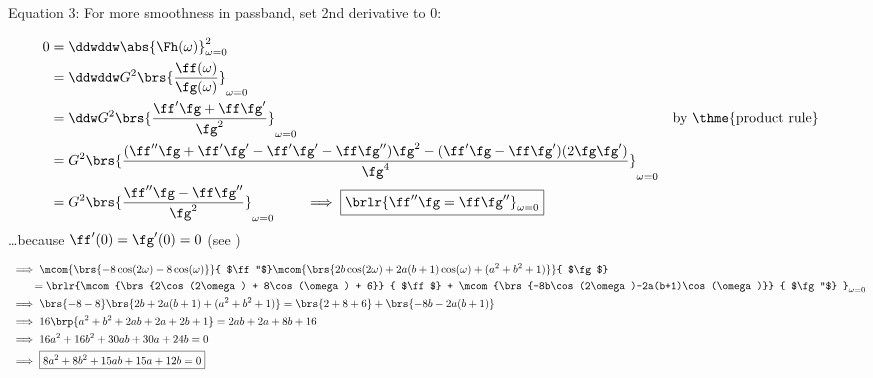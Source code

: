 Equation 3: For more smoothness in passband, set 2nd derivative to 0:
{\begin{align*}
  0 &= \ddwddw\abs{\Fh(\omega)}^2_{\omega=0}
  \\&= \ddwddw G^2 \brs{\frac{\ff(\omega)}
                             {\fg(\omega)}
                       }_{\omega=0}
  \\&= \ddw    G^2 \brs{\frac{\ff'\fg + \ff \fg'}
                             {\fg^2}
                       }_{\omega=0}
    && \text{by \thme{product rule}}
  \\&=         G^2 \brs{\frac{(\ff''\fg + \ff'\fg' - \ff'\fg' -\ff\fg'')\fg^2 - (\ff'\fg - \ff\fg')(2\fg\fg')}
                             {\fg^4}
                       }_{\omega=0}
  \\&=         G^2 \brs{\frac{\ff''\fg -\ff\fg''}
                             {\fg^2}
                       }_{\omega=0}
     \qquad \implies \boxed{\brlr{\ff''\fg = \ff\fg''}_{\omega=0}}
\end{align*}
\ldots because $\ff'(0) = \fg'(0) = 0$ (see )
 
{ \begin{align*}
  &\implies \mcom{\brs{-8\cos(2\omega)-8\cos(\omega)}}
                   { $\ff''$}
                    \mcom{\brs{2b\cos(2\omega)+2a(b+1)\cos(\omega)+(a^2+b^2+1)}}
                         { $\fg$}
              \\&\qquad= \brlr{\mcom{\brs{2\cos(2\omega) + 8\cos(\omega) + 6}}
                                    { $\ff$}
                  + \mcom{\brs{-8b\cos(2\omega)-2a(b+1)\cos(\omega)}}
                         { $\fg''$}
                   }_{\omega=0} 
  \\&\implies \brs{-8-8}        \brs{2b+2a(b+1)+(a^2+b^2+1)}
                = \brs{2 + 8 + 6} + \brs{-8b-2a(b+1)}
  \\&\implies 16\brp{a^2+b^2 +2ab + 2a + 2b + 1} = 2ab + 2a + 8b + 16
  \\&\implies 16a^2+ 16b^2 +30ab + 30a + 24b = 0
  \\&\implies \boxed{8a^2+ 8b^2 +15ab + 15a + 12b = 0}
\end{align*}}




}
